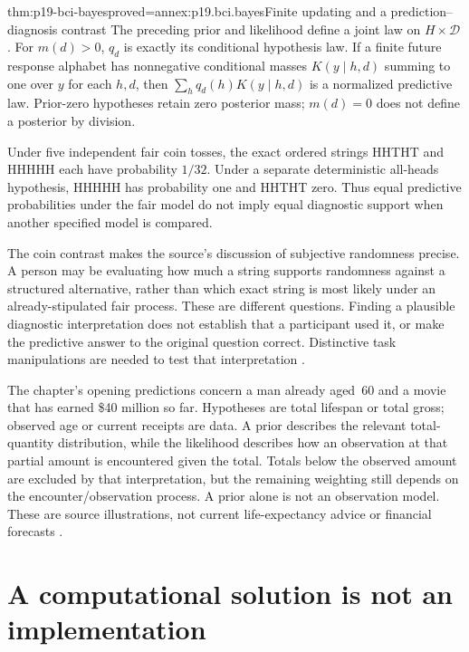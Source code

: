 \begin{hbtheorem}{thm:p19-bci-bayes}{proved=annex:p19.bci.bayes}{Finite updating and a prediction--diagnosis contrast}
The preceding prior and likelihood define a joint law on \(H\times\mathcal D\).
For \(m(d)>0\), \(q_d\) is exactly its conditional hypothesis law.
If a finite future response alphabet has nonnegative conditional masses
\(K(y\mid h,d)\) summing to one over \(y\) for each \(h,d\),
then \(\sum_hq_d(h)K(y\mid h,d)\) is a normalized predictive law.
Prior-zero hypotheses retain zero posterior mass; \(m(d)=0\) does not
define a posterior by division.

Under five independent fair coin tosses, the exact ordered strings HHTHT
and HHHHH each have probability \(1/32\). Under a separate deterministic
all-heads hypothesis, HHHHH has probability one and HHTHT zero. Thus equal
predictive probabilities under the fair model do not imply equal diagnostic
support when another specified model is compared.
\end{hbtheorem}

The coin contrast makes the source's discussion of subjective randomness
precise. A person may be evaluating how much a string supports randomness
against a structured alternative, rather than which exact string is most
likely under an already-stipulated fair process. These are different questions.
Finding a plausible diagnostic interpretation does not establish that a
participant used it, or make the predictive answer to the original question
correct. Distinctive task manipulations are needed to test that interpretation
\cite[pp.~26--27]{GriffithsTenenbaumKemp2012BayesianInference}.

The chapter's opening predictions concern a man already aged~60 and a
movie that has earned \$40 million so far. Hypotheses are total lifespan or
total gross; observed age or current receipts are data. A prior describes
the relevant total-quantity distribution, while the likelihood describes
how an observation at that partial amount is encountered given the total.
Totals below the observed amount are excluded by that interpretation, but
the remaining weighting still depends on the encounter/observation process.
A prior alone is not an observation model. These are source illustrations,
not current life-expectancy advice or financial forecasts
\cite[pp.~23--24]{GriffithsTenenbaumKemp2012BayesianInference}.

\section{A computational solution is not an implementation}
\label{sec:p19-bci-levels}

